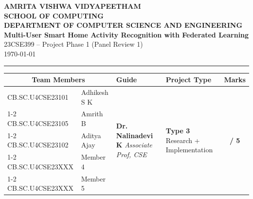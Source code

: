 \documentclass[11pt, a4paper]{article}
\begin{document}
\noindent
\begin{minipage}{\textwidth}
    \centering
    {\Large \textbf{\textcolor{amritaMaroon}{
    AMRITA VISHWA VIDYAPEETHAM \\
    SCHOOL OF COMPUTING \\
    DEPARTMENT OF COMPUTER SCIENCE AND ENGINEERING \\
    }}} 
    \vspace{0.15cm}
    {\large \textbf{Multi-User Smart Home Activity Recognition with Federated Learning}} \\
    \vspace{0.08cm}
    23CSE399 -- Project Phase 1 (Panel Review 1) \\
    \today
\end{minipage}

\vspace{0.25cm}
\hrule
\vspace{0.2cm}

\noindent
\begin{center}
    \small
    \renewcommand{\arraystretch}{1.3}
    \setlength{\tabcolsep}{4pt}
    \begin{tabular}{|l|p{3.2cm}|p{3.8cm}|p{2.3cm}|c|}
        \hline
        \multicolumn{2}{|c|}{\textbf{Team Members}} & \textbf{Guide} & \textbf{Project Type} & \textbf{Marks} \\ 
        \hline
        \small CB.SC.U4CSE23101 & \small Adhikesh S K & \multirow{5}{=}{\raggedright \small \textbf{Dr. Nalinadevi K} \newline \textit{Associate Prof, CSE}} & \multirow{5}{=}{\raggedright \small \textbf{Type 3} \newline Research + Implementation} & \multirow{5}{*}{\textbf{\huge / 5}} \\ 
        \cline{1-2}
        \small CB.SC.U4CSE23105 & \small Amrith B &  &  &  \\ 
        \cline{1-2}
        \small CB.SC.U4CSE23102 & \small Aditya Ajay &  &  &  \\ 
        \cline{1-2}
        \small CB.SC.U4CSE23XXX & \small Member 4 &  &  &  \\
        \cline{1-2}
        \small CB.SC.U4CSE23XXX & \small Member 5 &  &  &  \\ 
        \hline
    \end{tabular}
\end{center}
\vspace{0.15cm}
\end{document}
